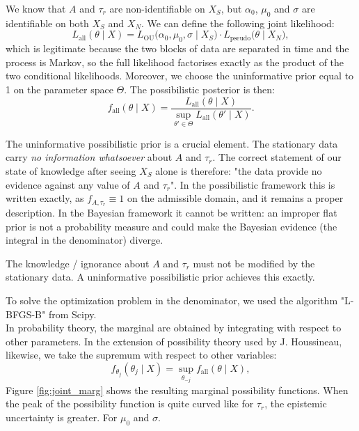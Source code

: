 \documentclass[12pt,a4paper]{article}
\theoremstyle{definition}
\theoremstyle{plain}
\begin{document}
\noindent We know that $A$ and $\tau_r$ are non-identifiable on $X_S$, but $\alpha_0$, $\mu_0$ and $\sigma$ are identifiable on both $X_S$ and $X_N$. We can define the following joint likelihood:
\begin{equation}
\label{eq:joint}
L_{\mathrm{all}}(\theta\mid X)=
L_{\mathrm{OU}}\big(\alpha_0,\mu_0,\sigma\mid X_S\big)\cdot
L_{\mathrm{pseudo}}\big(\theta\mid X_N\big),
\end{equation}
which is legitimate because the two blocks of data are separated in time and the process is
Markov, so the full likelihood factorises exactly as the product of the two conditional
likelihoods. Moreover, we choose the uninformative prior equal to 1 on the parameter space $\Theta$. The possibilistic posterior is then:
\begin{equation}
\label{eq:posterior}
f_{\mathrm{all}}(\theta\mid X)=
\frac{L_{\mathrm{all}}(\theta\mid X)}
{\sup_{\theta'\in\Theta}L_{\mathrm{all}}(\theta'\mid X)} .
\end{equation}


\noindent The uninformative possibilistic prior is a crucial element. 
The stationary data carry \emph{no information whatsoever} about $A$ and $\tau_r$. The correct statement of our state of knowledge after seeing
$X_S$ alone is therefore: "the data provide no evidence against any value of $A$ and
$\tau_r$". In the possibilistic framework this is written exactly, as $f_{A,\tau_r}\equiv1$ on
the admissible domain, and it remains a proper description. In the Bayesian framework it
cannot be written: an improper flat prior is not a probability measure and could make the Bayesian evidence (the integral in the denominator) diverge. 

\begin{tcolorbox}
\center The knowledge / ignorance about $A$ and $\tau_r$ must not be modified by the stationary data. A uninformative possibilistic prior achieves this exactly.
\end{tcolorbox}

\noindent To solve the optimization problem in the denominator, we used the algorithm "L-BFGS-B" from Scipy. \\

\noindent In probability theory, the marginal are obtained by integrating with respect to other parameters. In the extension of possibility theory used by J. Houssineau, likewise, we take the supremum with respect to other variables:
\[
f_{\theta_j}(\theta_j\mid X)=\sup_{\theta_{-j}}f_{\mathrm{all}}(\theta\mid X),
\]
Figure \ref{fig:joint_marg} shows the resulting marginal possibility functions. When the peak of the possibility function is quite curved like for $\tau_r$, the epistemic uncertainty is greater. For $\mu_0$ and $\sigma$. 
\end{document}
